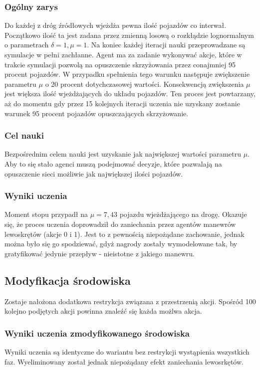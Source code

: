 \documentclass[12pt]{book}
\theoremstyle{plain}
\begin{document}
\subsubsection*{Ogólny zarys}
Do każdej z dróg źródłowych wjeżdża pewna ilość pojazdów co interwał. Początkowo ilość ta jest zadana przez zmienną losową o rozkłądzie lognormalnym o parametrach $\delta=1, \mu=1$. Na koniec każdej iteracji nauki przeprowadzane są symulacje w pełni zachłanne. Agent ma za zadanie wykonywać akcje, które w trakcie symulacji pozwolą na opuszczenie skrzyżowania przez conajmniej 95 procent pojazdów. W przypadku spełnienia tego warunku następuje zwiększenie parametru $\mu$ o 20 procent dotychczasowej wartości. Konsekwencją zwiększenia $\mu$ jest większa ilość wjeżdżających do układu pojazdów. Ten proces jest powtarzany, aż do momentu gdy przez 15 kolejnych iteracji uczenia nie uzyskany zostanie warunek 95 procent pojazdów opuszczających skrzyżowanie.
\subsubsection*{Cel nauki}
Bezpośrednim celem nauki jest uzyskanie jak największej wartości parametru $\mu$. Aby to się stało agenci muszą podejmować decyzje, które pozwalają na opuszczenie sieci możliwie jak największej ilości pojazdów.
\subsubsection*{Wyniki uczenia}
Moment stopu przypadł na $\mu=7,43$ pojazdu wjeżdżającego na drogę. Okazuje się, że proces uczenia doprowadził do zaniechania przez agentów manewrów lewoskrętów (akcje 0 i 1). Jest to z pewnością niepożądane zachowanie, jednak można było się go spodziewać, gdyż nagrody zostały wymodelowane tak, by gratyfikować jedynie przepływ - nieistotne z jakiego manewru. 
\subsection{Modyfikacja środowiska}
Zostaje nałożona dodatkowa restrykcja związana z przestrzenią akcji. Spośród 100 kolejno podjętych akcji powinna znaleźć się każda możlwa akcja.
\subsubsection*{Wyniki uczenia zmodyfikowanego środowiska}
Wyniki uczenia są identyczne do wariantu bez restrykcji wystąpienia wszystkich faz. Wyeliminowany został jednak niepożądany efekt zaniechania lewosrkętów.
\end{document}
